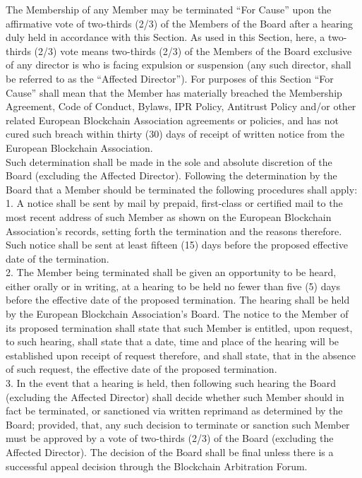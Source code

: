 \documentclass{article}
\begin{document}
The Membership of any Member may be terminated “For Cause” upon the affirmative vote of two-thirds (2/3) of the Members of the Board after a hearing duly held in accordance with this Section. 
As used in this Section, here, a two-thirds (2/3) vote means two-thirds (2/3) of the Members of the Board exclusive of any director is who is facing expulsion or suspension (any such director, shall be referred to as the “Affected Director”).
 For purposes of this Section “For Cause” shall mean that the Member has materially breached the Membership Agreement, Code of Conduct, Bylaws, IPR Policy, Antitrust Policy and/or other related European Blockchain Association agreements or policies, and has not cured such breach within thirty (30) days of receipt of written notice from the European Blockchain Association.\\
Such determination shall be made in the sole and absolute discretion of the Board (excluding the Affected Director).
 Following the determination by the Board that a Member should be terminated the following procedures shall apply: \\
 
1. A notice shall be sent by mail by prepaid, first-class or certified mail to the most recent address of such Member as shown on the European Blockchain Association's records, setting forth the termination and the reasons therefore. Such notice shall be sent at least fifteen (15) days before the proposed effective date of the termination. \\

2. The Member being terminated shall be given an opportunity to be heard, either orally or in writing, at a hearing to be held no fewer than five (5) days before the effective date of the proposed termination. 
The hearing shall be held by the European Blockchain Association's Board. 
The notice to the Member of its proposed termination shall state that such Member is entitled, upon request, to such hearing, shall state that a date, time and place of the hearing will be established upon receipt of request therefore, and shall state, that in the absence of such request, the effective date of the proposed termination. \\

3. In the event that a hearing is held, then following such hearing the Board (excluding the Affected Director) shall decide whether such Member should in fact be terminated, or sanctioned via written reprimand as determined by the Board; provided, that, any such decision to terminate or sanction such Member must be approved by a vote of two-thirds (2/3) of the Board (excluding the Affected Director). 
The decision of the Board shall be final unless there is a successful appeal decision through the Blockchain Arbitration Forum. \\ 
\end{document}
